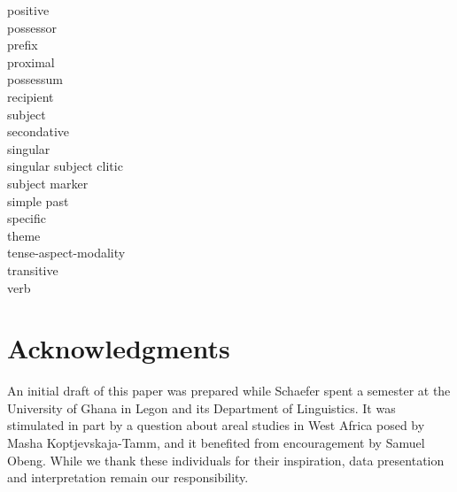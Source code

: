 \documentclass[output=paper,colorlinks,citecolor=brown]{langscibook}
\begin{document}
\begin{multicols}{2}
\begin{tabbing}
 \>positive\\
 \>possessor\\
 \>	prefix\\
 \>proximal\\
 \>possessum\\
 \>recipient\\
 \>	subject\\
 \>secondative\\
 \>singular\\
 \>singular subject clitic\\
 \>subject marker\\
 \>simple past\\
 \>specific\\
 \>theme\\
 \>tense-aspect-modality\\
 \>transitive\\
 \>verb\\
\end{tabbing}
\end{multicols}

\section*{Acknowledgments}

An initial draft of this paper was prepared while Schaefer spent a semester at the University of Ghana in Legon and its Department of Linguistics. It was stimulated in part by a question about areal studies in West Africa posed by Masha Koptjevskaja-Tamm, and it benefited from encouragement by Samuel Obeng. While we thank these individuals for their inspiration, data presentation and interpretation remain our responsibility.


{\printbibliography[heading=subbibliography,notkeyword=this]}
\end{document}

